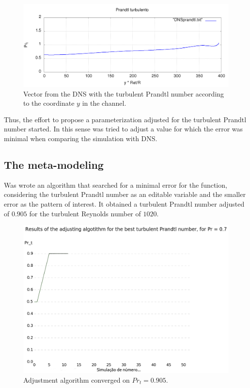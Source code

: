 \documentclass[10pt]{article} %
\begin{document}
\begin{figure}[h!]
	\centering
	\includegraphics[angle=0, scale=0.25]{perfisPrandtlturb_Ret_Pt}
	\caption{Vector from the DNS with the turbulent Prandtl number according to the coordinate $ y $ in the channel.}
\end{figure}

Thus, the effort to propose a parameterization adjusted for the turbulent Prandtl number started.
In this sense was tried to adjust a value for which the error was minimal when comparing the simulation with DNS.

\newpage

\subsection{The meta-modeling}
Was wrote an algorithm that searched for a minimal error for the function, considering the turbulent Prandtl number as an editable variable and the smaller error as the pattern of interest.
It obtained a turbulent Prandtl number adjusted of $ 0.905 $ for the turbulent Reynolds number of $ 1020$.
\begin{figure}[!h]
	\centering
	\includegraphics[angle=0, scale=0.25]{oloco}
	\caption{Adjustment algorithm converged on $Pr_t = 0.905$.}
\end{figure}
\end{document}
